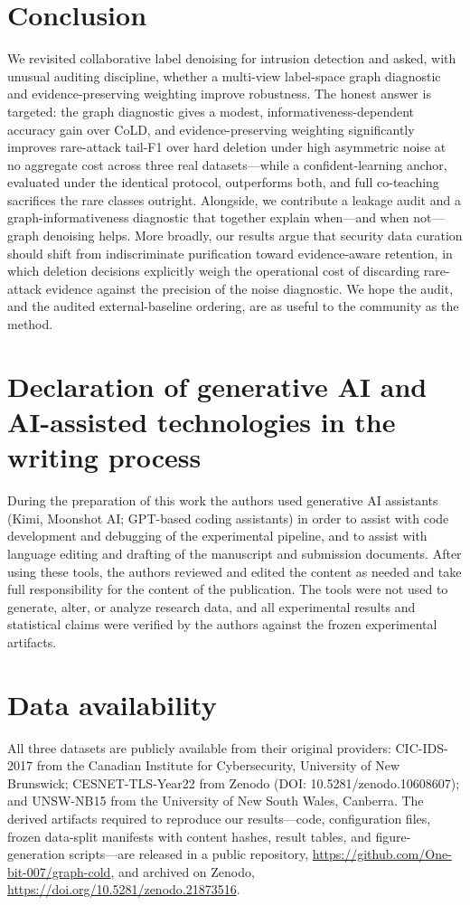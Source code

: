 \documentclass[preprint,3p,times]{elsarticle}
\begin{document}
\section{Conclusion}
\label{sec:conclusion}
We revisited collaborative label denoising for intrusion detection and asked, with
unusual auditing discipline, whether a multi-view label-space graph diagnostic and
evidence-preserving weighting improve robustness. The honest answer is targeted:
the graph diagnostic gives a modest, informativeness-dependent accuracy gain over
CoLD, and evidence-preserving weighting significantly improves rare-attack tail-F1
over hard deletion under high asymmetric noise at no aggregate cost across three
real datasets---while a confident-learning anchor, evaluated under the identical
protocol, outperforms both, and full co-teaching sacrifices the rare classes
outright. Alongside, we
contribute a leakage audit and a graph-informativeness diagnostic that together
explain when—and when not—graph denoising helps. More broadly, our results
argue that security data curation should shift from indiscriminate purification
toward evidence-aware retention, in which deletion decisions explicitly weigh
the operational cost of discarding rare-attack evidence against the precision
of the noise diagnostic. We hope the audit, and the
audited external-baseline ordering, are as useful to the community as the method.

\section*{Declaration of generative AI and AI-assisted technologies in the
writing process}
During the preparation of this work the authors used generative AI assistants
(Kimi, Moonshot AI; GPT-based coding assistants) in order to assist with code
development and debugging of the experimental pipeline, and to assist with
language editing and drafting of the manuscript and submission documents. After
using these tools, the authors reviewed and edited the content as needed and
take full responsibility for the content of the publication. The tools were not
used to generate, alter, or analyze research data, and all experimental results
and statistical claims were verified by the authors against the frozen
experimental artifacts.

\section*{Data availability}
All three datasets are publicly available from their original providers:
CIC-IDS-2017 from the Canadian Institute for Cybersecurity, University of New
Brunswick; CESNET-TLS-Year22 from Zenodo (DOI: 10.5281/zenodo.10608607); and
UNSW-NB15 from the University of New South Wales, Canberra. The derived
artifacts required to reproduce our results---code, configuration files, frozen
data-split manifests with content hashes, result tables, and figure-generation
scripts---are released in a public repository,
\url{https://github.com/One-bit-007/graph-cold}, and archived on Zenodo,
\url{https://doi.org/10.5281/zenodo.21873516}.
\end{document}

